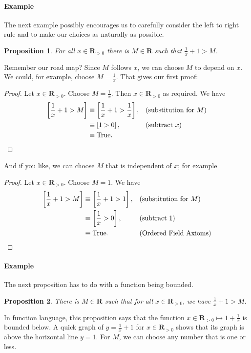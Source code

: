\documentclass[12pt,fleqn]{article}
\newcommand{\reals}{\mathbf{R}}
\newcommand{\true}{\mathrm{True}}
\newenvironment{myproof}
  {\begin{shaded}\begin{proof}}
  {\end{proof}\end{shaded}}
\newtheorem{prop}{Proposition}
\newcounter{ex}\setcounter{ex}{0}
\newcommand{\ex}{%
\setcounter{ex}{\value{ex}+1}
\paragraph{Example \theex}}
\begin{document}
   


       \ex The next example possibly encourages us to carefully 
       consider the left to right rule and to make our choices 
       as naturally as possible.

    \begin{prop} For all $x \in \reals_{>0}$ there is $M \in \reals$ such
     that $\frac{1}{x} +1 > M$. 
    \end{prop}
    Remember our road map? Since $M$ follows $x$, we can choose $M$ to depend on $x$. We could, for example, 
    choose $M = \frac{1}{x}$. That gives our first proof:
         \begin{myproof} 
      Let $x \in \reals_{>0}$. Choose $M = \frac{1}{x}$.  Then $x  \in \reals_{>0}$ as required. We have
          \begin{align*}
          \left[\frac{1}{x}+1>M \right] &\equiv \left[\frac{1}{x}+1> \frac{1}{x} \right], &&\text{(substitution for $M$)} \\
                                  &\equiv \left [1 >0 \right], && \text{(subtract $x$)} \\
                                  &\equiv \true.  &&  \qedhere
      \end{align*}
\end{myproof}
And if you like, we can choose $M$ that is independent of $x$; for example    
    \begin{myproof} 
      Let $x \in \reals_{>0}$. Choose $M = 1$. We have
          \begin{align*}
          \left[\frac{1}{x}+1>M \right] &\equiv \left[\frac{1}{x}+1>1\right], &&\text{(substitution for $M$)} \\
                                  &\equiv \left [\frac{1}{x}>0 \right],
                                  &&\text {(subtract 1)} \\
                                  &\equiv \true. &&\text {(Ordered Field Axioms)} \qedhere
      \end{align*}
\end{myproof}

\ex The next proposition has to do with a function being bounded.
    \begin{prop}
      There is $M \in \reals$ such that for all $x \in \reals_{>0}$,
     we have $\frac{1}{x} + 1 > M$. 
    \end{prop}
    In function language, this proposition  says that the function $x \in \reals_{>0} \mapsto 1+\frac{1}{x}$ is bounded below.
        A quick graph of $ y = \frac{1}{x} + 1 $ for  $x \in \reals_{>0}$ shows that its graph is above the horizontal line $y = 1$. For $M$, 
    we can choose any number that is one or less.
    
\end{document}
